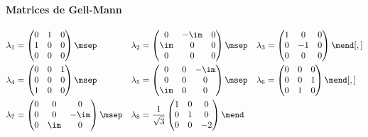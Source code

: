 \paragraph{Matrices de Gell-Mann}

\begin{align*}
\lambda_1 &= \begin{pmatrix}0&1&0\\1&0&0\\0&0&0\end{pmatrix}
\msep&
\lambda_2 &= \begin{pmatrix}0&-\im&0\\\im&0&0\\0&0&0\end{pmatrix}
\msep&
\lambda_3 &= \begin{pmatrix}1&0&0\\0&-1&0\\0&0&0\end{pmatrix}
\mend[,]
\\
\lambda_4 &= \begin{pmatrix}0&0&1\\0&0&0\\1&0&0\end{pmatrix}
\msep&
\lambda_5 &= \begin{pmatrix}0&0&-\im\\0&0&0\\\im&0&0\end{pmatrix}
\msep&
\lambda_6 &= \begin{pmatrix}0&0&0\\0&0&1\\0&1&0\end{pmatrix}
\mend[,]
\\
\lambda_7 &= \begin{pmatrix}0&0&0\\0&0&-\im\\0&\im&0\end{pmatrix}
\msep&
\lambda_8 &= \frac{1}{\sqrt{3}}\begin{pmatrix}1&0&0\\0&1&0\\0&0&-2\end{pmatrix}
\mend
\end{align*}
